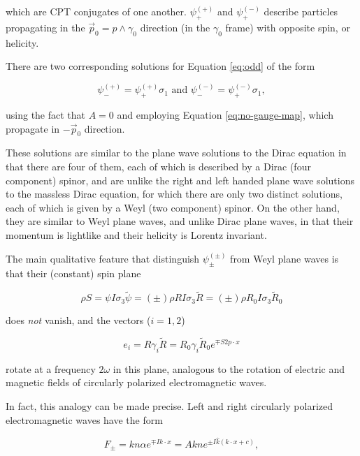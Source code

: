 \documentclass{article}
\begin{document}
  which are CPT conjugates of one another. $\psi^{(+)}_+$ and $\psi^{(-)}_+$ describe particles propagating in the $\vec p_0 = p \wedge \gamma_0$ direction (in the $\gamma_0$ frame) with opposite spin, or helicity.

  There are two corresponding solutions for Equation \ref{eq:odd} of the form

  \begin{equation}
    \psi^{(+)}_- = \psi^{(+)}_+ \sigma_1 \text{ and }
    \psi^{(-)}_- = \psi^{(-)}_+ \sigma_1,
  \end{equation}

  using the fact that $A=0$ and employing Equation \ref{eq:no-gauge-map}, which propagate in $-\vec p_0$ direction.

  These solutions are similar to the plane wave solutions to the Dirac equation in that there are four of them, each of which is described by a Dirac (four component) spinor, and are unlike the right and left handed plane wave solutions to the massless Dirac equation, for which there are only two distinct solutions, each of which is given by a Weyl (two component) spinor. On the other hand, they are similar to Weyl plane waves, and unlike Dirac plane waves, in that their momentum is lightlike and their helicity is Lorentz invariant.

  The main qualitative feature that distinguish $\psi^{(\pm)}_{\pm}$ from Weyl plane waves is that their (constant) spin plane 

  \begin{equation}
    \rho S = \psi I \sigma_3 \widetilde \psi = (\pm) \rho  R I \sigma_3 \widetilde R = (\pm) \rho R_0 I \sigma_3 \widetilde R_0
  \end{equation}

  does \emph{not} vanish, and the vectors ($i = 1, 2$)

  \begin{equation}
    e_i = R \gamma_i \widetilde R = R_0 \gamma_i \widetilde R_0 e^{\mp S 2 p \cdot x}
  \end{equation} 

  rotate at a frequency $2 \omega$ in this plane, analogous to the rotation of electric and magnetic fields of circularly polarized electromagnetic waves.

  In fact, this analogy can be made precise. Left and right circularly polarized electromagnetic waves have the form\cite{gap}

    \begin{equation}
      F_\pm = k n \alpha e^{\mp I k \cdot x} = A k n e^{\pm I \hat k (k \cdot x + c)},\label{eq:emwaves}
    \end{equation}
\end{document}
